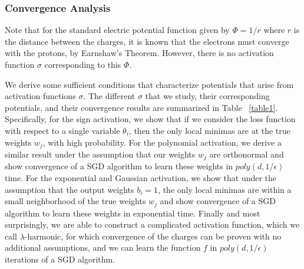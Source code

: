 \documentclass{article}
\begin{document}
\subsubsection{Convergence Analysis}

Note that for the standard electric potential function given by $\Phi = 1/r$ where $r$ is the distance between the charges, it is known that the electrons must converge with the protons, by Earnshaw's Theorem. However, there is no activation function $\sigma$ corresponding to this $\Phi$. 

We derive some sufficient conditions that characterize potentials that arise from activation functions $\sigma$. The different $\sigma$ that we study, their corresponding potentials, and their convergence results are summarized in Table ~\ref{table1}. Specifically, for the sign activation, we show that if we consider the loss function with respect to a single variable $\theta_i$, then the only local minimas are at the true weights $w_j$, with high probability. For the polynomial activation, we derive a similar result under the assumption that our weights $w_j$ are orthonormal and show convergence of a SGD algorithm to learn these weights in $poly(d,1/\epsilon)$ time. For the exponential and Gaussian activation, we show that under the assumption that the output weights $b_i = 1$, the only local minimas are within a small neighborhood of the true weights $w_j$ and show convergence of a SGD algorithm to learn these weights in exponential time. Finally and most surprisingly, we are able to construct a complicated activation function, which we call $\lambda$-harmonic, for which convergence of the charges can be proven with no additional assumptions, and we can learn the function $f$ in $poly(d,1/\epsilon)$ iterations of a SGD algorithm.
\end{document}
